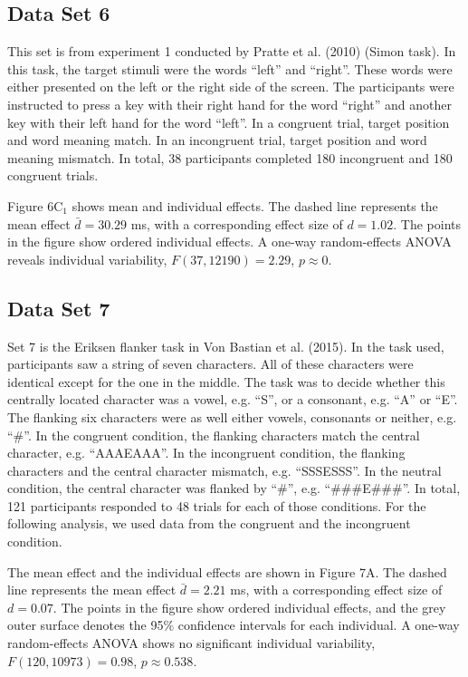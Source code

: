 \documentclass[american,man]{apa6}
\begin{document}
\subsection{Data Set 6}\label{data-set-6}

This set is from experiment 1 conducted by Pratte et al. (2010) (Simon
task). In this task, the target stimuli were the words \enquote{left}
and \enquote{right}. These words were either presented on the left or
the right side of the screen. The participants were instructed to press
a key with their right hand for the word \enquote{right} and another key
with their left hand for the word \enquote{left}. In a congruent trial,
target position and word meaning match. In an incongruent trial, target
position and word meaning mismatch. In total, 38 participants completed
180 incongruent and 180 congruent trials.

Figure 6\(\mbox{C}_1\) shows mean and individual effects. The dashed
line represents the mean effect \(\bar{d} = 30.29\) ms, with a
corresponding effect size of \(d = 1.02\). The points in the figure show
ordered individual effects. A one-way random-effects ANOVA reveals
individual variability, \(F(37, 12190) = 2.29\), \(p \approx 0\).

\subsection{Data Set 7}\label{data-set-7}

Set 7 is the Eriksen flanker task in Von Bastian et al. (2015). In the
task used, participants saw a string of seven characters. All of these
characters were identical except for the one in the middle. The task was
to decide whether this centrally located character was a vowel, e.g.
\enquote{S}, or a consonant, e.g. \enquote{A} or \enquote{E}. The
flanking six characters were as well either vowels, consonants or
neither, e.g. \enquote{\#}. In the congruent condition, the flanking
characters match the central character, e.g. \enquote{AAAEAAA}. In the
incongruent condition, the flanking characters and the central character
mismatch, e.g. \enquote{SSSESSS}. In the neutral condition, the central
character was flanked by \enquote{\#}, e.g. \enquote{\#\#\#E\#\#\#}. In
total, 121 participants responded to 48 trials for each of those
conditions. For the following analysis, we used data from the congruent
and the incongruent condition.

The mean effect and the individual effects are shown in Figure 7A. The
dashed line represents the mean effect \(\bar{d} = 2.21\) ms, with a
corresponding effect size of \(d = 0.07\). The points in the figure show
ordered individual effects, and the grey outer surface denotes the 95\%
confidence intervals for each individual. A one-way random-effects ANOVA
shows no significant individual variability, \(F(120, 10973) = 0.98\),
\(p \approx 0.538\).
\end{document}
